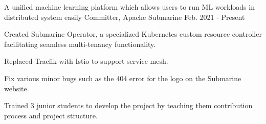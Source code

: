 

\begin{cventries}

  \cventry
  {A unified machine learning platform which allows users to run ML workloads in distributed system easily}
  {Committer, Apache Submarine \href{https://github.com/apache/submarine}{\color{red}{[GitHub Link]}}} %
  {}
  {Feb. 2021 - Present} %
  {
    \begin{cvitems} %
      \item {Created Submarine Operator, a specialized Kubernetes custom resource controller facilitating seamless multi-tenancy functionality.}
      \item {Replaced Traefik with Istio to support service mesh.}
      \item {Fix various minor bugs such as the 404 error for the logo on the Submarine website.}
      \item {Trained 3 junior students to develop the project by teaching them contribution process and project structure.}
    \end{cvitems}
  }

\end{cventries}
